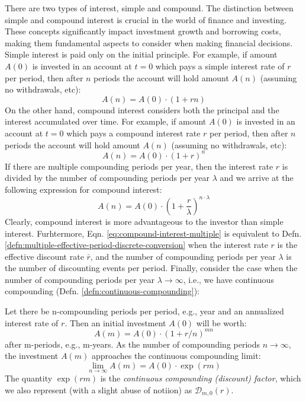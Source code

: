 \documentclass[11pt]{article}
\theoremstyle{definition}
\begin{document}
There are two types of interest, simple and compound. The distinction between simple and compound interest is crucial in the world of finance and investing.
These concepts significantly impact investment growth and borrowing costs, making them fundamental aspects to consider when making financial decisions. 
Simple interest is paid only on the initial principle. 
For example, if amount $A(0)$ is invested in an account at $t=0$ which pays a simple interest rate of $r$ per period, 
then after $n$ periods the account will hold amount $A(n)$ (assuming no withdrawals, etc):
\begin{equation}\label{eq:simple-interest}
A(n) = A(0)\cdot\left(1+rn\right)
\end{equation}
On the other hand, compound interest considers both the principal and the interest accumulated over time. 
For example, if amount $A(0)$ is invested in an account at $t=0$ which pays a compound interest rate $r$ per period, 
then after $n$ periods the account will hold amount $A(n)$ (assuming no withdrawals, etc):
\begin{equation}\label{eq:compound-interest}
A(n) = A(0)\cdot\left(1+r\right)^n
\end{equation}
If there are multiple compounding periods per year, then the interest rate $r$ is divided by the number of compounding periods per year $\lambda$
and we arrive at the following expression for compound interest:
\begin{equation}\label{eq:compound-interest-multiple}
A(n) = A(0)\cdot\left(1+\frac{r}{\lambda}\right)^{n\cdot\lambda}
\end{equation}
Clearly, compound interest is more advantageous to the investor than simple interest. 
Furhtermore, Eqn. \eqref{eq:compound-interest-multiple} is equivalent to Defn. \ref{defn:multiple-effective-period-discrete-conversion}
when the interest rate $r$ is the effective discount rate $\bar{r}$, and the number of compounding periods per year $\lambda$ is the number of discounting events per period.
Finally, consider the case when the number of compounding periods per year $\lambda\rightarrow\infty$, i.e., we have continuous compounding (Defn. \ref{defn:continuous-compounding}):
\begin{definition}\label{defn:continuous-compounding}
Let there be n-compounding periods per period, e.g., year and an annualized interest rate of $r$.  
Then an initial investment $A(0)$ will be worth:
\begin{equation}\label{eqn-compound-interest-model-discrete}
A(m) = A(0)\cdot\left(1+r/n\right)^{mn}
\end{equation}
after m-periods, e.g., m-years. As the number of compounding periods $n\rightarrow\infty$, 
the investment $A(m)$ approaches the continuous compounding limit:
\begin{equation}\label{eqn-compound-interest-model-cont}    
\lim_{n\rightarrow\infty}A(m) = A(0)\cdot\exp\left(rm\right)
\end{equation}
The quantity $\exp\left(rm\right)$ is the \textit{continuous compounding (discount) factor}, 
which we also represent (with a slight abuse of notiion) as $\mathcal{D}_{m,0}(r)$.
\end{definition}
\end{document}
